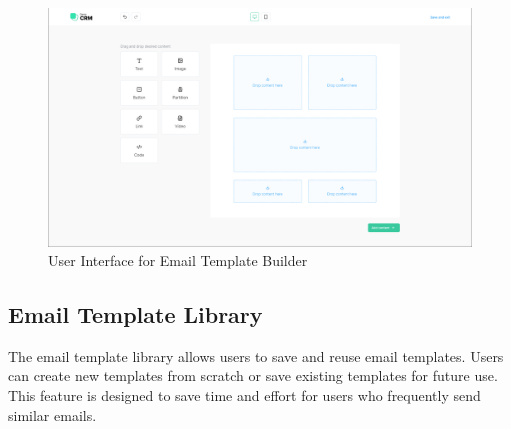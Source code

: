 \begin{figure}[ht]
	\centering
	\includegraphics[width=0.9\linewidth]{Images/Sprint1/screenshots/Screenshot 2024-05-26 214054.png}
	\caption{User Interface for Email Template Builder}
	\label{fig:User Interface for Email Template Builder}
\end{figure}

\subsection{Email Template Library}

The email template library allows users to save and reuse email templates. Users can create new templates from scratch or save existing templates for future use. This feature is designed to save time and effort for users who frequently send similar emails.

